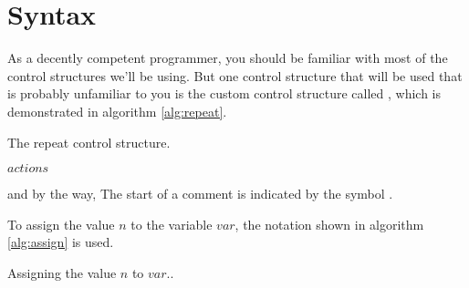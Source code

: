 \section{Syntax}

As a decently competent programmer, you should be familiar with most
of the control structures we'll be using. But one control structure
that will be used that is probably unfamiliar to you is the custom
control structure called \algorithmicrepeat, which is demonstrated in
algorithm \ref{alg:repeat}.

\begin{algorithm}[H]
  \caption{The repeat control structure.}
  \label{alg:repeat}
  \begin{algorithmic}[1]
      \State $actions$ 
    \EndRepeatn
  \end{algorithmic}
\end{algorithm}

and by the way, The start of a comment is indicated by the symbol \commentsymbol.

To assign the value $n$ to the variable $var$, the notation shown in
algorithm \ref{alg:assign} is used.

\begin{algorithm}[H]
  \caption{Assigning the value $n$ to $var$..}
  \label{alg:assign}
  \begin{algorithmic}[1]
  \end{algorithmic}
\end{algorithm}
